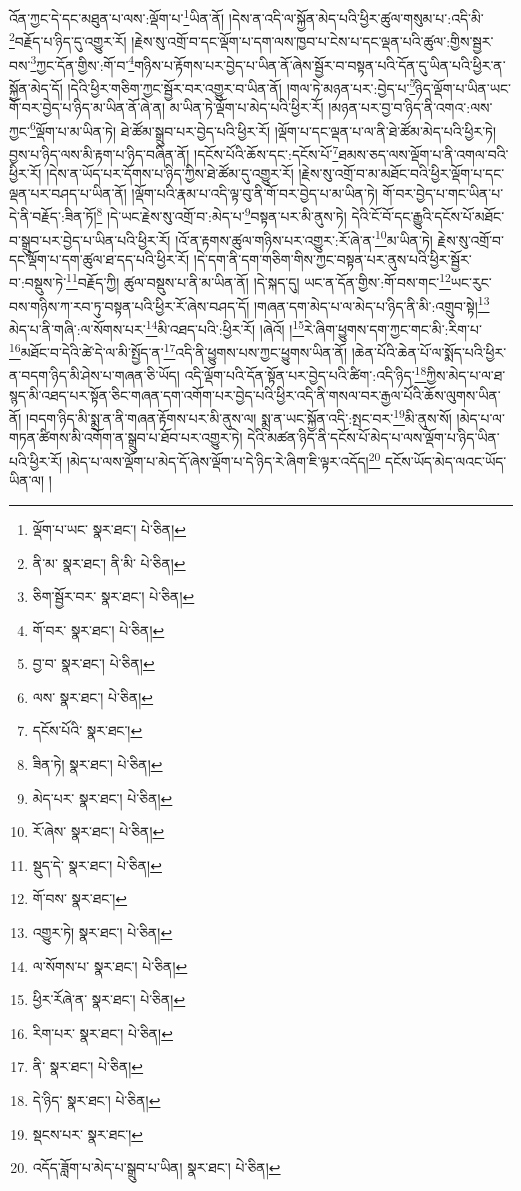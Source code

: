 འོན་ཀྱང་དེ་དང་མཐུན་པ་ལས་:ལྡོག་པ་\footnote{ལྡོག་པ་ཡང་  སྣར་ཐང་།  པེ་ཅིན། }ཡིན་ནོ། །དེས་ན་འདི་ལ་སྐྱོན་མེད་པའི་ཕྱིར་ཚུལ་གསུམ་པ་:འདི་མི་\footnote{ནི་མ་  སྣར་ཐང་། ནི་མི་  པེ་ཅིན། }བརྗོད་པ་ཉིད་དུ་འགྱུར་རོ། །རྗེས་སུ་འགྲོ་བ་དང་ལྡོག་པ་དག་ལས་ཁྱབ་པ་ངེས་པ་དང་ལྡན་པའི་ཚུལ་:གྱིས་སྦྱར་བས་\footnote{ཅིག་སྦྱོར་བར་  སྣར་ཐང་།  པེ་ཅིན། }ཀྱང་དོན་གྱིས་:གོ་བ་\footnote{གོ་བར་  སྣར་ཐང་།  པེ་ཅིན། }གཉིས་པ་རྟོགས་པར་བྱེད་པ་ཡིན་ནོ་ཞེས་སྦྱོར་བ་བསྟན་པའི་དོན་དུ་ཡིན་པའི་ཕྱིར་ན་སྐྱོན་མེད་དོ། །དེའི་ཕྱིར་གཅིག་ཀྱང་སྦྱོར་བར་འགྱུར་བ་ཡིན་ནོ། །གལ་ཏེ་མཉན་པར་:བྱེད་པ་\footnote{བྱ་བ་  སྣར་ཐང་།  པེ་ཅིན། }ཉིད་ལྡོག་པ་ཡིན་ཡང་གོ་བར་བྱེད་པ་ཉིད་མ་ཡིན་ནོ་ཞེ་ན། མ་ཡིན་ཏེ་ལྡོག་པ་མེད་པའི་ཕྱིར་རོ། །མཉན་པར་བྱ་བ་ཉིད་ནི་འགའ་:ལས་ཀྱང་\footnote{ལས་  སྣར་ཐང་།  པེ་ཅིན། }ལྡོག་པ་མ་ཡིན་ཏེ། ཐེ་ཚོམ་སྒྲུབ་པར་བྱེད་པའི་ཕྱིར་རོ། །ལྡོག་པ་དང་ལྡན་པ་ལ་ནི་ཐེ་ཚོམ་མེད་པའི་ཕྱིར་ཏེ། བྱས་པ་ཉིད་ལས་མི་རྟག་པ་ཉིད་བཞིན་ནོ། །དངོས་པོའི་ཆོས་དང་:དངོས་པོ་\footnote{དངོས་པོའི་  སྣར་ཐང་། }ཐམས་ཅད་ལས་ལྡོག་པ་ནི་འགལ་བའི་ཕྱིར་རོ། །དེས་ན་ཡོད་པར་དོགས་པ་ཉིད་ཀྱིས་ཐེ་ཚོམ་དུ་འགྱུར་རོ། །རྗེས་སུ་འགྲོ་བ་མ་མཐོང་བའི་ཕྱིར་ལྡོག་པ་དང་ལྡན་པར་བཤད་པ་ཡིན་ནོ། །ལྡོག་པའི་རྣམ་པ་འདི་ལྟ་བུ་ནི་གོ་བར་བྱེད་པ་མ་ཡིན་ཏེ། གོ་བར་བྱེད་པ་གང་ཡིན་པ་དེ་ནི་བརྗོད་:ཟིན་ཏོ།\footnote{ཟིན་ཏེ།  སྣར་ཐང་།  པེ་ཅིན། } །དེ་ཡང་རྗེས་སུ་འགྲོ་བ་:མེད་པ་\footnote{མེད་པར་  སྣར་ཐང་།  པེ་ཅིན། }བསྟན་པར་མི་ནུས་ཏེ། དེའི་ངོ་བོ་དང་རྒྱུའི་དངོས་པོ་མཐོང་བ་སྒྲུབ་པར་བྱེད་པ་ཡིན་པའི་ཕྱིར་རོ། །འོ་ན་རྟགས་ཚུལ་གཉིས་པར་འགྱུར་:རོ་ཞེ་ན་\footnote{རོ་ཞེས་  སྣར་ཐང་།  པེ་ཅིན། }མ་ཡིན་ཏེ། རྗེས་སུ་འགྲོ་བ་དང་ལྡོག་པ་དག་ཚུལ་ཐ་དད་པའི་ཕྱིར་རོ། །དེ་དག་ནི་དག་གཅིག་གིས་ཀྱང་བསྟན་པར་ནུས་པའི་ཕྱིར་སྦྱོར་བ་:བསྡུས་ཏེ་\footnote{སྡུད་དེ་  སྣར་ཐང་།  པེ་ཅིན། }བརྗོད་ཀྱི། ཚུལ་བསྡུས་པ་ནི་མ་ཡིན་ནོ། །དེ་སྐད་དུ། ཡང་ན་དོན་གྱིས་:གོ་བས་གང་\footnote{གོ་བས་  སྣར་ཐང་། }ཡང་རུང་བས་གཉིས་ཀ་རབ་ཏུ་བསྟན་པའི་ཕྱིར་རོ་ཞེས་བཤད་དོ། །གཞན་དག་མེད་པ་ལ་མེད་པ་ཉིད་ནི་མི་:འགྲུབ་སྟེ།\footnote{འགྱུར་ཏེ།  སྣར་ཐང་།  པེ་ཅིན། } མེད་པ་ནི་གཞི་:ལ་སོགས་པར་\footnote{ལ་སོགས་པ་  སྣར་ཐང་།  པེ་ཅིན། }མི་འཐད་པའི་:ཕྱིར་རོ། །ཞེའོ། །\footnote{ཕྱིར་རོཞེ་ན་  སྣར་ཐང་།  པེ་ཅིན། }རེ་ཞིག་ཕྱུགས་དག་ཀྱང་གང་མི་:རིག་པ་\footnote{རིག་པར་  སྣར་ཐང་།  པེ་ཅིན། }མཐོང་བ་དེའི་ཚེ་དེ་ལ་མི་སྤྱོད་ན་\footnote{ནི་  སྣར་ཐང་།  པེ་ཅིན། }འདི་ནི་ཕྱུགས་པས་ཀྱང་ཕྱུགས་ཡིན་ནོ། །ཆེན་པོའི་ཆེན་པོ་ལ་སྨོད་པའི་ཕྱིར་ན་བདག་ཉིད་མི་ཤེས་པ་གཞན་ཅི་ཡོད། འདི་ལྡོག་པའི་དོན་སྟོན་པར་བྱེད་པའི་ཚིག་:འདི་ཉིད་\footnote{དེ་ཉིད་  སྣར་ཐང་།  པེ་ཅིན། }ཀྱིས་མེད་པ་ལ་ཐ་སྙད་མི་འཐད་པར་སྟོན་ཅིང་གཞན་དག་འགོག་པར་བྱེད་པའི་ཕྱིར་འདི་ནི་གསལ་བར་རྒྱལ་པོའི་ཆོས་ལུགས་ཡིན་ནོ། །བདག་ཉིད་མི་སྨྲ་ན་ནི་གཞན་རྟོགས་པར་མི་ནུས་ལ། སྨྲ་ན་ཡང་སྐྱོན་འདི་:སྤང་བར་\footnote{སྡངས་པར་  སྣར་ཐང་། }མི་ནུས་སོ། །མེད་པ་ལ་གཏན་ཚིགས་མི་འགོག་ན་སྒྲུབ་པ་ཐོབ་པར་འགྱུར་ཏེ། དེའི་མཚན་ཉིད་ནི་དངོས་པོ་མེད་པ་ལས་ལྡོག་པ་ཉིད་ཡིན་པའི་ཕྱིར་རོ། །མེད་པ་ལས་ལྡོག་པ་མེད་དོ་ཞེས་ལྡོག་པ་དེ་ཉིད་རེ་ཞིག་ཇི་ལྟར་འདོད།\footnote{འདོད་ཟློག་པ་མེད་པ་སྒྲུབ་པ་ཡིན།  སྣར་ཐང་།  པེ་ཅིན། } དངོས་ཡོད་མེད་ལའང་ཡོད་ཡིན་ལ། །
